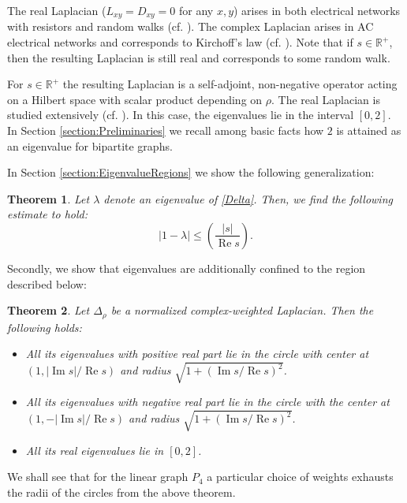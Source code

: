 \documentclass[a4paper,11pt]{amsart}
\newtheorem{theorem}{Theorem}
\theoremstyle{definition}
\renewcommand{\Re}{\operatorname{Re}}%
\renewcommand{\Im}{\operatorname{Im}}%
\newcommand{\R}{\mathbb{R}}
\begin{document}
The real Laplacian ($L_{xy}=D_{xy}=0$ for any $x,y$)  arises in both electrical networks with resistors and random walks (cf. \cite{DoyleSnell, Grigoryan, Levin, Woess}). The complex Laplacian arises in AC electrical networks and corresponds to Kirchoff's law (cf. \cite{Feynman1, Hughes, Muranova1, MuranovaThesis}). Note that if $s \in \R^+$, then the resulting Laplacian is still real and corresponds to some random walk.


For $s \in \R^+$ the resulting Laplacian is a self-adjoint, non-negative operator acting on a Hilbert space with scalar product depending on $\rho$. The real Laplacian is studied extensively (cf. \cite{ BauerJost, Chung, Grigoryan}). In this case, the eigenvalues lie in the interval $[0,2]$. In Section \ref{section:Preliminaries} we recall among basic facts how $2$ is attained as an eigenvalue for bipartite graphs.



In Section \ref{section:EigenvalueRegions} we show the following generalization:
\begin{theorem}
\label{thm:EigenvaluesAroundOne}
Let $\lambda$ denote an eigenvalue of \eqref{Delta}. Then, we find the following estimate to hold:
\begin{equation}
\label{eq:EigenvalueEstimateII}
|1 - \lambda| \leq \left( \frac{|s|}{\Re s} \right).
\end{equation}
\end{theorem}

Secondly, we show that eigenvalues are additionally confined to the region described below:
\begin{theorem}
\label{thm:CircleRegions}
Let $\Delta_\rho$ be a normalized complex-weighted Laplacian. Then the following holds:
\begin{itemize}
\item
All its eigenvalues with positive real part lie in the circle with center at $(1,|\Im s|/\Re s)$ and radius $\sqrt {1+(\Im s/\Re s)^2}$.
\item
All its eigenvalues with negative real part lie in the circle with the center at $(1,-|\Im s|/\Re s)$ and radius $\sqrt {1+(\Im s/\Re s)^2}$.
\item
All its real eigenvalues lie in $[0,2]$.
\end{itemize}
\end{theorem}
We shall see that for the linear graph $P_4$ a particular choice of weights exhausts the radii of the circles from the above theorem.
\end{document}
